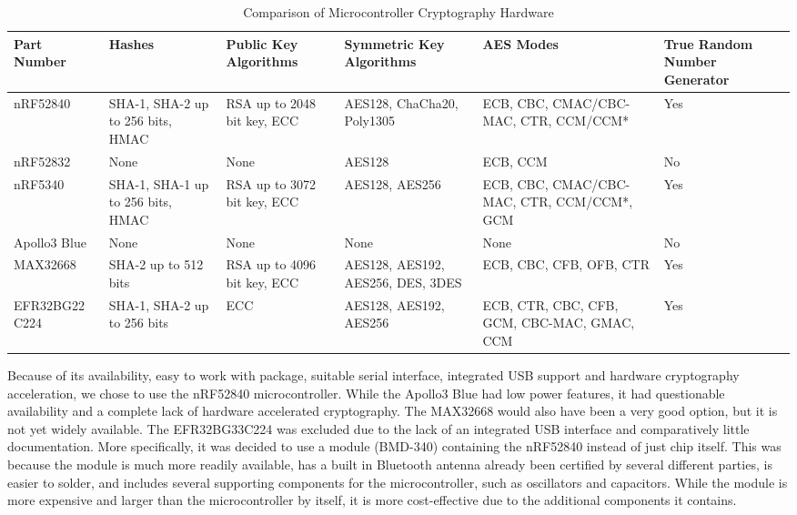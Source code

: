 \begin{table}[htb]
\centering
\begin{tabular}{>{\centering\arraybackslash}m{2.5cm}|
                >{\centering\arraybackslash}m{2.0cm}|
                >{\centering\arraybackslash}m{2.0cm}|
                >{\centering\arraybackslash}m{2.5cm}|
                >{\centering\arraybackslash}m{2.5cm}|
                >{\centering\arraybackslash}m{1.5cm}}
\toprule
Part Number & Hashes & Public Key Algorithms & Symmetric Key Algorithms & AES Modes & True Random Number Generator \\
\midrule
nRF52840 & SHA-1, SHA-2 up to 256 bits, HMAC & RSA up to 2048 bit key, ECC & AES128, ChaCha20, Poly1305 & ECB, CBC, CMAC/CBC-MAC, CTR, CCM/CCM* & Yes \\
nRF52832 & None & None & AES128 & ECB, CCM & No \\
nRF5340 & SHA-1, SHA-1 up to 256 bits, HMAC & RSA up to 3072 bit key, ECC & AES128, AES256 & ECB, CBC, CMAC/CBC-MAC, CTR, CCM/CCM*, GCM & Yes \\
Apollo3 Blue & None & None & None & None & No \\
MAX32668 & SHA-2 up to 512 bits & RSA up to 4096 bit key, ECC & AES128, AES192, AES256, DES, 3DES & ECB, CBC, CFB, OFB, CTR & Yes \\
EFR32BG22 C224 & SHA-1, SHA-2 up to 256 bits & ECC & AES128, AES192, AES256 & ECB, CTR, CBC, CFB, GCM, CBC-MAC, GMAC, CCM & Yes \\
\bottomrule
\end{tabular}
\caption{Comparison of Microcontroller Cryptography Hardware}
\label{tab:mcu-comp-crypto}
\end{table}

Because of its availability, easy to work with package, suitable
serial interface, integrated USB support and hardware cryptography acceleration,
we chose to use the nRF52840 microcontroller. While the Apollo3 Blue had low 
power features, it had questionable availability and a complete lack of hardware 
accelerated cryptography. The MAX32668 would also have been a very good 
option, but it is not yet widely available. The EFR32BG33C224 was excluded due to the lack of an 
integrated USB interface and comparatively little documentation.
More specifically, it was decided to use a module (BMD-340) containing the
nRF52840 instead of just chip itself. This was because 
the module is much more readily available, has a built in Bluetooth 
antenna already been certified by several different parties, is 
easier to solder, and includes several supporting components for the 
microcontroller, such as oscillators and capacitors. While the module is more 
expensive and larger than the microcontroller by itself, it is more cost-effective due to
the additional components it contains.


